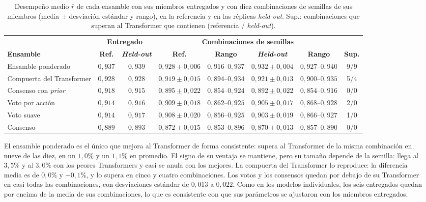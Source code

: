 \documentclass[../00_Main/Main.tex]{subfiles}
\begin{document}
\begin{table}[H]
\centering
\caption[Variabilidad de los ensambles entre semillas de sus miembros]{Desempe\~no
medio $\bar r$ de cada ensamble con sus miembros entregados y con diez
combinaciones de semillas de sus miembros (media $\pm$ desviaci\'on
est\'andar y rango), en la referencia y en las r\'eplicas
\emph{held-out}. Sup.: combinaciones que superan al Transformer que
contienen (referencia / \emph{held-out}).}
\label{tab:ens-seeds}
\footnotesize
\setlength{\tabcolsep}{3pt}
\begin{adjustbox}{max width=\textwidth}
\begin{tabular}{@{}lccccccc@{}}
\toprule
 & \multicolumn{2}{c}{\textbf{Entregado}} & \multicolumn{4}{c}{\textbf{Combinaciones de semillas}} & \\
\cmidrule(lr){2-3}\cmidrule(lr){4-7}
\textbf{Ensamble} & \textbf{Ref.} & \textbf{\emph{Held-out}} & \textbf{Ref.} & \textbf{Rango} & \textbf{\emph{Held-out}} & \textbf{Rango} & \textbf{Sup.} \\
\midrule
Ensamble ponderado          & $0{,}937$ & $0{,}939$ & $0{,}928 \pm 0{,}006$ & $0{,}916$--$0{,}937$ & $0{,}932 \pm 0{,}004$ & $0{,}927$--$0{,}940$ & 9/9 \\
Compuerta del Transformer   & $0{,}928$ & $0{,}928$ & $0{,}919 \pm 0{,}015$ & $0{,}894$--$0{,}934$ & $0{,}921 \pm 0{,}013$ & $0{,}900$--$0{,}935$ & 5/4 \\
Consenso con \emph{prior}   & $0{,}918$ & $0{,}915$ & $0{,}895 \pm 0{,}022$ & $0{,}854$--$0{,}924$ & $0{,}892 \pm 0{,}022$ & $0{,}854$--$0{,}916$ & 0/0 \\
Voto por acci\'on           & $0{,}914$ & $0{,}916$ & $0{,}909 \pm 0{,}018$ & $0{,}862$--$0{,}925$ & $0{,}905 \pm 0{,}017$ & $0{,}868$--$0{,}928$ & 2/0 \\
Voto suave                  & $0{,}914$ & $0{,}917$ & $0{,}908 \pm 0{,}020$ & $0{,}856$--$0{,}925$ & $0{,}903 \pm 0{,}019$ & $0{,}866$--$0{,}927$ & 1/0 \\
Consenso                    & $0{,}889$ & $0{,}893$ & $0{,}872 \pm 0{,}015$ & $0{,}853$--$0{,}896$ & $0{,}870 \pm 0{,}013$ & $0{,}857$--$0{,}890$ & 0/0 \\
\bottomrule
\end{tabular}
\end{adjustbox}
\end{table}

El ensamble ponderado es el \'unico que mejora al Transformer de forma
consistente: supera al Transformer de la misma combinaci\'on en nueve de
las diez, en un $1{,}0\%$ y un $1{,}1\%$ en promedio. El signo de su
ventaja se mantiene, pero su tama\~no depende de la semilla: llega al
$3{,}5\%$ y al $3{,}0\%$ con los peores Transformers y casi se anula con
los mejores. La compuerta del Transformer lo reproduce: la diferencia
media es de $0{,}0\%$ y $-0{,}1\%$, y lo supera en cinco y cuatro
combinaciones. Los votos y los consensos quedan por debajo de su
Transformer en casi todas las combinaciones, con desviaciones est\'andar
de $0{,}013$ a $0{,}022$. Como en los modelos individuales, los seis entregados quedan
por encima de la media de sus combinaciones, lo que es consistente con que
sus par\'ametros se ajustaron con los miembros entregados.

\biblio
\end{document}
